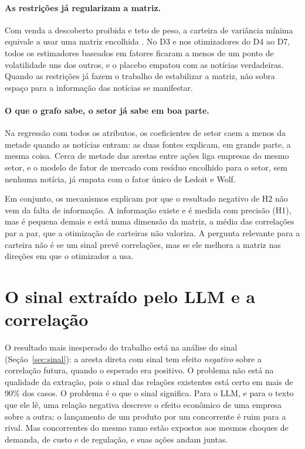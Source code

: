 \paragraph{As restrições já regularizam a matriz.} Com venda a descoberto proibida e teto de peso, a
carteira de variância mínima equivale a usar uma matriz encolhida \citep{jagannathan2003}. No D3 e nos
otimizadores do D4 ao D7, todos os estimadores baseados em fatores ficaram a menos de um ponto de
volatilidade uns dos outros, e o placebo empatou com as notícias verdadeiras. Quando as restrições já
fazem o trabalho de estabilizar a matriz, não sobra espaço para a informação das notícias se manifestar.

\paragraph{O que o grafo sabe, o setor já sabe em boa parte.} Na regressão com todos os atributos, os
coeficientes de setor caem a menos da metade quando as notícias entram: as duas fontes explicam, em grande
parte, a mesma coisa. Cerca de metade das arestas entre ações liga empresas do mesmo setor, e o modelo de
fator de mercado com resíduo encolhido para o setor, sem nenhuma notícia, já empata com o fator único de
Ledoit e Wolf.

Em conjunto, os mecanismos explicam por que o resultado negativo de H2 não vem da falta de informação. A
informação existe e é medida com precisão (H1), mas é pequena demais e está numa dimensão da matriz, a
média das correlações par a par, que a otimização de carteiras não valoriza. A pergunta relevante para a
carteira não é se um sinal prevê correlações, mas se ele melhora a matriz nas direções em que o otimizador
a usa.

\section{O sinal extraído pelo LLM e a correlação}
\label{sec:sinal-llm}

O resultado mais inesperado do trabalho está na análise do sinal (Seção~\ref{sec:sinal}): a aresta direta
com sinal tem efeito \emph{negativo} sobre a correlação futura, quando o esperado era positivo. O problema
não está na qualidade da extração, pois o sinal das relações existentes está certo em mais de 90\% dos
casos. O problema é o que o sinal significa. Para o LLM, e para o texto que ele lê, uma relação negativa
descreve o efeito econômico de uma empresa sobre a outra: o lançamento de um produto por um concorrente é
ruim para a rival. Mas concorrentes do mesmo ramo estão expostos aos mesmos choques de demanda, de custo e
de regulação, e suas ações andam juntas.

